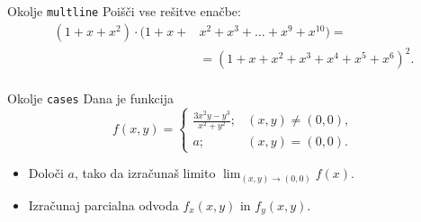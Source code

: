 \begin{frame}{Okolje \texttt{multline}}
	Poišči vse rešitve enačbe:
	\begin{align*}
		(1+x+x^2) \cdot (1+x+&x^2+x^3+\ldots+x^9+x^{10}) =\\ 
		&=(1+x+x^2+x^3+x^4+x^5+x^6)^2.\\
	\end{align*}
\end{frame}

\begin{frame}{Okolje \texttt{cases}}
	Dana je funkcija
	$$
	f(x,y) = \begin{cases}
		\frac{3x^2y-y^3}{x^2+y^2}; & (x,y) \neq  (0,0),\\
		a; & (x,y) = (0,0).
	\end{cases}
	$$

	\begin{itemize}
	\item Določi $a$, tako da izračunaš limito \( \lim_{(x,y)\to(0,0)} f(x). \)
	\item Izračunaj parcialna odvoda $f_x(x,y)$ in $f_y(x,y)$.
	\end{itemize}
\end{frame}
